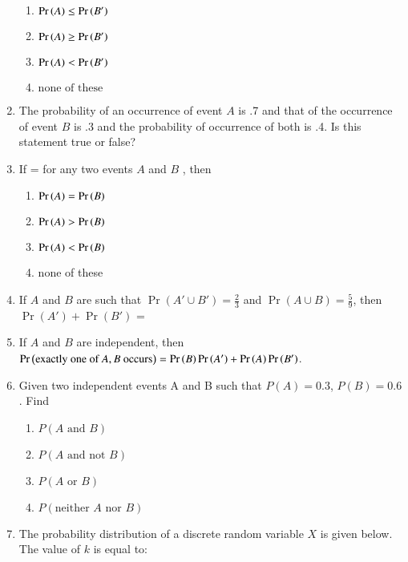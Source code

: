 \begin{enumerate}[label=\thesubsection.\arabic*,ref=\thesubsection.\theenumi,resume*]
\begin{enumerate}
\item $\Pr\left(A\right) \leq\Pr\left(B^\prime\right)$
\item $\Pr\left(A\right) \geq \Pr\left(B^\prime\right)$
\item $\Pr\left(A\right) < \Pr\left(B^\prime\right)$
\item $\text{none of these}$
\end{enumerate}
\solution 

\item The probability of an occurrence of event $A$ is .7 and that of the occurrence of event $B$ is .3 and the probability of occurrence of both is .4. Is this statement true or false?\\
\solution

\item If  =  for any two events $A$ and $B$ , then
\begin{enumerate}
\item $\Pr\left(A\right)=\Pr\left(B\right)$
\item $\Pr\left(A\right) > \Pr\left(B\right)$
\item $\Pr\left(A\right) < \Pr\left(B\right)$
\item none of these
\end{enumerate}
\solution

\item If $A$ and $B$ are such that 
$\Pr(A' \cup B') = \frac{2}{3}$ and $\Pr(A \cup B) = \frac{5}{9}$, 
then $\Pr(A') + \Pr(B')$ = \\
\solution

\item If $A$ and $B$ are independent, then 
	$\Pr\left(\text{exactly one of } A, B \text{ occurs}\right) =\Pr\left(B\right)\Pr\left(A^{\prime}\right)+\Pr\left(A\right)\Pr\left(B^{\prime}\right)$.\\
\solution 

\item Given two independent events A and B such that $P(A) = 0.3$, $P(B) = 0.6$. Find
		\label{ncert/12/13/2/10}
\begin{enumerate}
\item $P(A\text{ and } B)$
\item $P(A \text{ and not } B)$
\item $P(A \text{ or } B)$
\item $P(\text{neither } A \text{ nor } B)$
\end{enumerate}
\item The probability distribution of a discrete random variable $X$ is given below. The value of $k$ is equal to:
\begin{table}[htb]
\centering


\end{table}
\end{enumerate}

